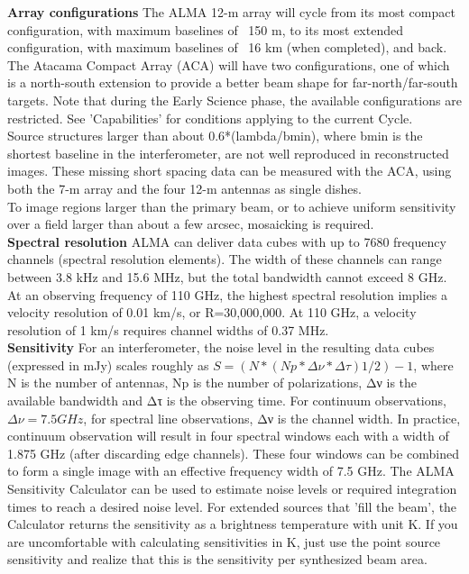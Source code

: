 \textbf{Array configurations}
The ALMA 12-m array will cycle from its most compact configuration, with maximum baselines of ~150 m, to its most extended configuration, with maximum baselines of ~16 km (when completed), and back. The Atacama Compact Array (ACA) will have two configurations, one of which is a north-south extension to provide a better beam shape for far-north/far-south targets. Note that during the Early Science phase, the available configurations are restricted. See 'Capabilities' for conditions applying to the current Cycle.\\

Source structures larger than about 0.6*(lambda/bmin), where bmin is the shortest baseline in the interferometer, are not well reproduced in reconstructed images. These missing short spacing data can be measured with the ACA, using both the 7-m array and the four 12-m antennas as single dishes.\\

To image regions larger than the primary beam, or to achieve uniform sensitivity over a field larger than about a few arcsec, mosaicking is required.\\

\textbf{Spectral resolution}
ALMA can deliver data cubes with up to 7680 frequency channels (spectral resolution elements). The width of these channels can range between 3.8 kHz and 15.6 MHz, but the total bandwidth cannot exceed 8 GHz. At an observing frequency of 110 GHz, the highest spectral resolution implies a velocity resolution of 0.01 km/s, or R=30,000,000. At 110 GHz, a velocity resolution of 1 km/s requires channel widths of 0.37 MHz.\\

\textbf{Sensitivity}
For an interferometer, the noise level in the resulting data cubes (expressed in mJy) scales roughly as $S=(N*(Np*Δ\nu * Δ\tau)1/2)-1$, where N is the number of antennas, Np is the number of polarizations, Δν is the available bandwidth and Δτ is the observing time. For continuum observations, $Δ\nu=7.5 GHz$, for spectral line observations, Δν is the channel width. In practice, continuum observation will result in four spectral windows each with a width of 1.875 GHz (after discarding edge channels). These four windows can be combined to form a single image with an effective frequency width of 7.5 GHz. The ALMA Sensitivity Calculator can be used to estimate noise levels or required integration times to reach a desired noise level. For extended sources that 'fill the beam', the Calculator returns the sensitivity as a brightness temperature with unit K. If you are uncomfortable with calculating sensitivities in K, just use the point source sensitivity and realize that this is the sensitivity per synthesized beam area.

